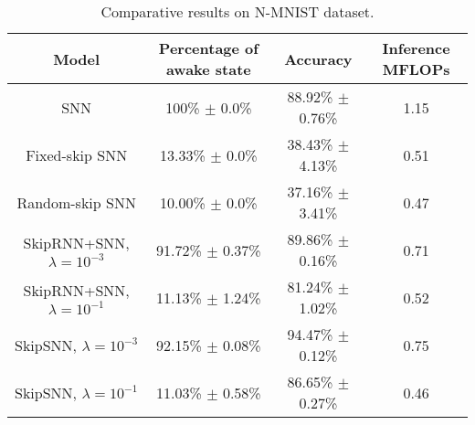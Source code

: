 \begin{table*}[t!]
\centering
\caption{Comparative results on N-MNIST dataset.}
\vspace{-5pt}
\label{tab:nmnist}
\begin{tabular}{cccc}
\hline
{Model} & {Percentage of awake state} & {Accuracy}&{Inference MFLOPs}\\
\hline
{SNN}    & 100\% $\pm$ 0.0\% & 88.92\% $\pm$ 0.76\% & 1.15 \\ {Fixed-skip SNN}    & 13.33\% $\pm$ 0.0\% & 38.43\% $\pm$ 4.13\% & 0.51 \\
{Random-skip SNN}    & 10.00\% $\pm$ 0.0\% & 37.16\% $\pm$ 3.41\% & 0.47 \\
{SkipRNN+SNN, $\lambda=10^{-3}$}    & 91.72\% $\pm$ 0.37\% & 89.86\% $\pm$ 0.16\% & 0.71 \\
{SkipRNN+SNN, $\lambda=10^{-1}$}    & 11.13\% $\pm$ 1.24\% & 81.24\% $\pm$ 1.02\% & 0.52 \\
\hline
{SkipSNN, $\lambda=10^{-3}$}    & 92.15\% $\pm$ 0.08\% & 94.47\% $\pm$ 0.12\% & 0.75 \\
{SkipSNN, $\lambda=10^{-1}$}    & 11.03\% $\pm$ 0.58\% & 86.65\% $\pm$ 0.27\% & 0.46 \\
\hline
\end{tabular}
\vspace{-5pt}
\end{table*}